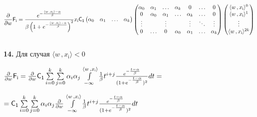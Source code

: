 \documentclass[a4paper,12pt]{article}
\begin{document}
\begin{displaymath}
    {\partial\over{\partial w}} \mathsf{F_i} = {e^{-{\langle w \,, x_{\mathsf{i}}\rangle - \alpha\over{\beta}}}\over{\beta\left(1 + e^{-{\langle w \,, x_{\mathsf{i}}\rangle - \alpha\over{\beta}}}\right)^2}} x_{\mathsf{i}} \mathsf{C_1} \begin{pmatrix}
        \alpha_0 & \alpha_1 & \ldots & \alpha_k \\
    \end{pmatrix} \begin{pmatrix}
        \alpha_0 & \alpha_1 & \ldots & \alpha_k & 0 & \ldots & 0 \\
        0 & \alpha_0 & \alpha_1 & \ldots & \alpha_k & \ldots & 0 \\
        \vdots &  & \vdots &  & \vdots & \ddots & \vdots\\
        0 & \ldots & 0 & \alpha_0 & \alpha_1 &\ldots & \alpha_k \\
    \end{pmatrix} \begin{pmatrix}
        \langle w \,, x_{\mathsf{i}}\rangle^{0} \\ \langle w \,, x_{\mathsf{i}}\rangle^{1} \\ \vdots \\ \langle w \,, x_{\mathsf{i}}\rangle^{\mathsf{2}k} \\
    \end{pmatrix}
\end{displaymath}\\

\noindent\textbf{14.} Для случая $\langle w \,, x_{\mathsf{i}}\rangle < 0$

\begin{center}
    ${\partial\over{\partial w}} \mathsf{F_i} = {\partial\over{\partial w}} \mathsf{C_1} \sum\limits_{i = 0}^k \sum\limits_{j = 0}^k \alpha_i \alpha_j \int\limits_{-\infty}^{\langle w \,, x_{\mathsf{i}}\rangle} {1\over{\beta}} t^{i + j} {e^{-{t - \alpha\over{\beta}}}\over{(1 + e^{-{t - \alpha\over{\beta}}}})^2} d t = $
\end{center}

\begin{center}
    $= \mathsf{C_1} \sum\limits_{i = 0}^k \sum\limits_{j = 0}^k \alpha_i \alpha_j {\partial\over{\partial w}} \int\limits_{-\infty}^{\langle w \,, x_{\mathsf{i}}\rangle} {1\over{\beta}} t^{i + j} {e^{-{t - \alpha\over{\beta}}}\over{(1 + e^{-{t - \alpha\over{\beta}}}})^2} d t$
\end{center}
\end{document}
